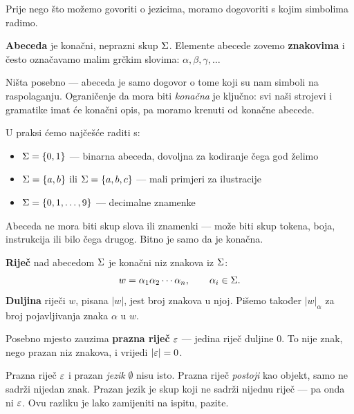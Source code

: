 Prije nego što možemo govoriti o jezicima, moramo dogovoriti s kojim simbolima
radimo.

\begin{definicija}[Abeceda]
\textbf{Abeceda} je konačni, neprazni skup $\Sigma$. Elemente abecede zovemo
\textbf{znakovima} i često označavamo malim grčkim slovima: $\alpha, \beta,
\gamma, \ldots$
\end{definicija}

Ništa posebno --- abeceda je samo dogovor o tome koji su nam simboli na
raspolaganju. Ograničenje da mora biti \emph{konačna} je ključno: svi naši
strojevi i gramatike imat će konačni opis, pa moramo krenuti od konačne
abecede.

\begin{primjer}
U praksi ćemo najčešće raditi s:
\begin{itemize}
  \item $\Sigma = \{0, 1\}$ --- binarna abeceda, dovoljna za kodiranje čega god želimo
  \item $\Sigma = \{a, b\}$ ili $\Sigma = \{a, b, c\}$ --- mali primjeri za ilustracije
  \item $\Sigma = \{0, 1, \ldots, 9\}$ --- decimalne znamenke
\end{itemize}
Abeceda ne mora biti skup slova ili znamenki --- može biti skup tokena, boja,
instrukcija ili bilo čega drugog. Bitno je samo da je konačna.
\end{primjer}

\begin{definicija}
\textbf{Riječ} nad abecedom $\Sigma$ je konačni niz znakova iz $\Sigma$:
\[
  w = \alpha_1 \alpha_2 \cdots \alpha_n, \qquad \alpha_i \in \Sigma.
\]
\textbf{Duljina} riječi $w$, pisana $|w|$, jest broj znakova u njoj.
Pišemo također $|w|_\alpha$ za broj pojavljivanja znaka $\alpha$ u $w$.
\end{definicija}

Posebno mjesto zauzima \textbf{prazna riječ} $\varepsilon$ --- jedina riječ duljine 0.
To nije znak, nego prazan niz znakova, i vrijedi $|\varepsilon| = 0$.

\begin{napomena}
Prazna riječ $\varepsilon$ i prazan \emph{jezik} $\emptyset$ nisu isto.
Prazna riječ \emph{postoji} kao objekt, samo ne sadrži nijedan znak.
Prazan jezik je skup koji ne sadrži nijednu riječ --- pa onda ni $\varepsilon$.
Ovu razliku je lako zamijeniti na ispitu, pazite.
\end{napomena}

